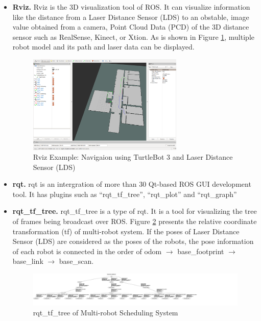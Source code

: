 \begin{itemize}
    \item \textbf{Rviz.} Rviz\cite{RVIZ} is the 3D visualization tool of ROS. It can visualize information like the distance from a Laser Distance Sensor (LDS) to an obstable, image value obtained from a camera, Point Cloud Data (PCD) of the 3D distance sensor such as RealSense, Kinect, or Xtion. As is shown in Figure \ref{fig:rviz_gui}, multiple robot model and its path and laser data can be displayed.
    \begin{figure}[htbp]
        \centering
        \includegraphics[width = 0.7\textwidth]{content/images/ch2/rviz_gui.png}
        \caption{Rviz Example: Navigaion using TurtleBot 3 and Laser Distance Sensor (LDS)}
        \label{fig:rviz_gui}
    \end{figure}

    \item \textbf{rqt.} rqt is an intergration of more than 30 Qt-based ROS GUI development tool. It has plugins such as ``rqt\_tf\_tree'', ``rqt\_plot'' and  ``rqt\_graph''
   
    \item \textbf{rqt\_tf\_tree.} rqt\_tf\_tree is a type of rqt. It is a tool for visualizing the tree of frames being broadcast over ROS. Figure \ref{fig:tf_tree} presents the relative coordinate transformation (tf) of multi-robot system. If the poses of Laser Distance Sensor (LDS) are considered as the poses of the robots, the pose information of each robot is connected in the order of odom $\rightarrow$ base\_footprint $\rightarrow$ base\_link $\rightarrow$ base\_scan.
    
    \begin{figure}[htbp]
        \centering
        \includegraphics[width = 1.0\textwidth]{content/images/ch2/rqt_tree.png}
        \caption{rqt\_tf\_tree of Multi-robot Scheduling System}
        \label{fig:tf_tree}
        \end{figure}
       

\end{itemize}
